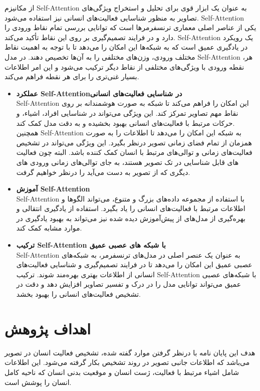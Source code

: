 از مکانیزم %
\gls{Self-Attention}
 به عنوان یک ابزار قوی برای تحلیل و استخراج ویژگی‌های تصاویر به منظور شناسایی فعالیت‌های انسانی نیز استفاده می‌شود.
\gls{Self-Attention}
یکی از عناصر اصلی معماری ترنسفرمرها است که توانایی بررسی تمام نقاط ورودی را دارد و در فرایند تصمیم‌گیری بر روی این نقاط تأکید می‌کند.
\gls{Self-Attention}
یک رویکرد در یادگیری عمیق است که به شبکه‌ها این امکان را می‌دهد تا با توجه به اهمیت نقاط مختلف ورودی، وزن‌های مختلفی را به آن‌ها تخصیص دهند.
در مدل %
\gls{Self-Attention}
،هر نقطه ورودی با ویژگی‌های مختلفی از نقاط دیگر ترکیب می‌شود و این امر اطلاعات بسیار غنی‌تری را برای هر نقطه فراهم می‌کند.

\begin{itemize}
	\item \textbf{عملکرد \gls{Self-Attention}در شناسایی فعالیت‌های انسانی}\\
\gls{Self-Attention}
 این امکان را فراهم می‌کند تا شبکه به صورت هوشمندانه بر روی نقاط مهم تصاویر تمرکز کند. این ویژگی می‌تواند در شناسایی افراد، اشیاء، و حرکات مرتبط با فعالیت‌های انسانی بهبود بخشیده و به دقت مدل کمک کند.\\
 همچنین %
\gls{Self-Attention}
  به شبکه این امکان را می‌دهد تا اطلاعات را به صورت همزمان از تمام فضای زمانی تصویر درنظر بگیرد. این ویژگی می‌تواند در تشخیص فعالیت‌های زمانی و توالی‌های مرتبط با انسان کمک کننده باشد. البته چون فعالیت های قابل شناسایی در تک تصویر هستند، به جای توالی‌های زمانی ورودی های دیگری که از تصویر به دست می‌آید را درنظر خواهیم گرفت.
  	\item \textbf{آموزش \gls{Self-Attention}}\\
	\gls{Self-Attention}
  با استفاده از مجموعه داده‌های بزرگ و متنوع، می‌تواند الگوها و اطلاعات مرتبط با فعالیت‌های انسانی را یاد بگیرد. استفاده از یادگیری انتقالی و بهره‌گیری از مدل‌های از پیش‌آموزش دیده شده نیز می‌تواند به بهبود یادگیری در موارد مشابه کمک کند.
    	\item \textbf{ترکیب \gls{Self-Attention} با شبکه های عصبی عمیق}\\
	\gls{Self-Attention}
 به عنوان یک عنصر اصلی در مدل‌های ترنسفرمر، به شبکه‌های عصبی عمیق این امکان را می‌دهد تا در فرایند تصمیم‌گیری و شناسایی فعالیت‌های انسانی از اطلاعات بهتری بهره‌مند شوند.
 ترکیب %
   \gls{Self-Attention}
  با شبکه‌های عصبی عمیق می‌تواند توانایی مدل را در درک و تفسیر تصاویر افزایش دهد و دقت در تشخیص فعالیت‌های انسانی را بهبود بخشد.
\end{itemize}
\section{اهداف پژوهش}
هدف این پایان نامه با درنظر گرفتن موارد گفته شده، تشخیص فعالیت انسان در تصویر می‌باشد که اطلاعات جانبی تصویر در روند تشخیص بکار گرفته می‌شود. این اطلاعات شامل اشیاء مرتبط با فعالیت، ژست انسان و موقعیت بدنی انسان که ناحیه کامل انسان را پوشش است.

